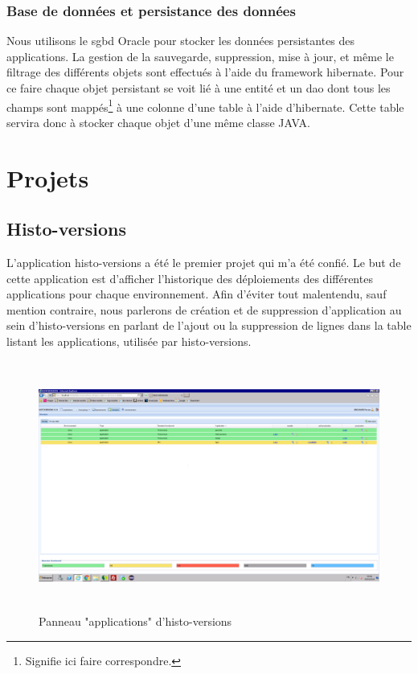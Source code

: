 \documentclass[12pt]{report}
\begin{document}
    \subsection{Base de données et persistance des données}
    Nous utilisons le \gls{sgbd} Oracle pour stocker les données persistantes des applications. La gestion de la sauvegarde, suppression, mise à jour, et même le filtrage des différents objets sont effectués à l'aide du framework \gls{hibernate}. Pour ce faire chaque objet persistant se voit lié à une entité et un \gls{dao} dont tous les champs sont mappés\footnote{Signifie ici faire correspondre.} à une colonne d'une table à l'aide d'\gls{hibernate}. Cette table servira donc à stocker chaque objet d'une même classe JAVA.
    
    \chapter{Projets}
    
    \section{Histo-versions}
    L'application histo-versions a été le premier projet qui m'a été confié. Le but de cette application est d'afficher l'historique des déploiements des différentes applications pour chaque environnement. Afin d'éviter tout malentendu, sauf mention contraire, nous parlerons de création et de suppression d'application au sein d'histo-versions en parlant de l'ajout ou la suppression de lignes dans la table listant les applications, utilisée par histo-versions.
    
    \begin{figure}[ht]
        \centering
        \includegraphics[height=8.2cm]{img/HV_Panel_versions.png}
        \caption{Panneau "applications" d'histo-versions}
        \label{fig:histoversions_versions}
    \end{figure}
    
\end{document}
